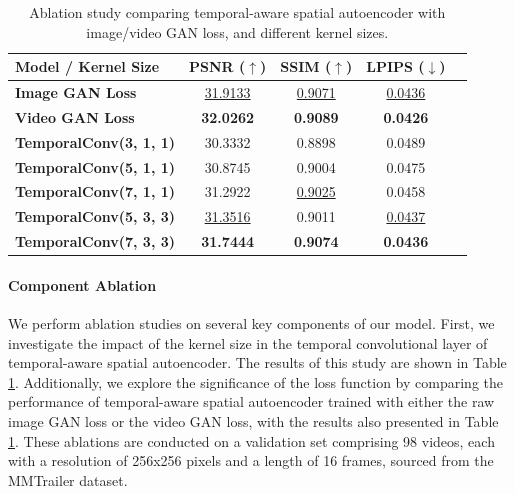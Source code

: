 \begin{table}[ht]
    \centering
    \setlength\tabcolsep{2pt} %
    \renewcommand{\arraystretch}{1} %
    \begin{tabular}{lcccc}
        \toprule
        \textbf{Model / Kernel Size} & \textbf{PSNR ($\uparrow$)} & \textbf{SSIM ($\uparrow$)} & \textbf{LPIPS ($\downarrow$)}  \\
        \midrule
        \textbf{Image GAN Loss} &  \underline{31.9133} & \underline{0.9071} & \underline{0.0436}  \\
        \textbf{Video GAN Loss} & \textbf{32.0262} & \textbf{0.9089} & \textbf{0.0426} \\
        \midrule
        \textbf{TemporalConv(3, 1, 1)} & 30.3332 & 0.8898 & 0.0489 \\
        \textbf{TemporalConv(5, 1, 1)} & 30.8745 & 0.9004 & 0.0475  \\
        \textbf{TemporalConv(7, 1, 1)} & 31.2922 & \underline{0.9025} & 0.0458  \\
        \textbf{TemporalConv(5, 3, 3)} & \underline{31.3516} & 0.9011 & \underline{0.0437}  \\
        \textbf{TemporalConv(7, 3, 3)} & \textbf{31.7444} & \textbf{0.9074} & \textbf{0.0436}  \\
        \bottomrule
    \end{tabular}
    \caption{Ablation study comparing temporal-aware spatial autoencoder with image/video GAN loss, and different kernel sizes.}
    \label{tab:ablation_combined}
    \vspace{-5mm}
\end{table}



\paragraph{Component Ablation}
We perform ablation studies on several key components of our model. First, we investigate the impact of the kernel size in the temporal convolutional layer of temporal-aware spatial autoencoder. The results of this study are shown in Table \ref{tab:ablation_combined}. Additionally, we explore the significance of the loss function by comparing the performance of temporal-aware spatial autoencoder trained with either the raw image GAN loss or the video GAN loss, with the results also presented in Table \ref{tab:ablation_combined}. These ablations are conducted on a validation set comprising 98 videos, each with a resolution of 256x256 pixels and a length of 16 frames, sourced from the MMTrailer dataset.








